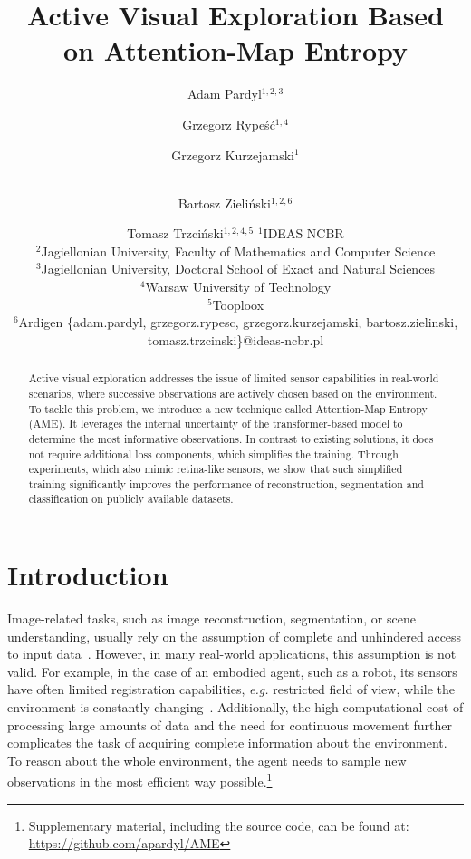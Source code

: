 \documentclass{article}
\title{Active Visual Exploration Based on Attention-Map Entropy}
\author{
Adam Pardyl$^{1,2,3}$\and
Grzegorz Rypeść$^{1,4}$\and
Grzegorz Kurzejamski$^1$\and \\
Bartosz Zieliński$^{1,2,6}$\and
Tomasz Trzciński$^{1,2,4,5}$
\affiliations
$^1$IDEAS NCBR\\
$^2$Jagiellonian University, Faculty of Mathematics and Computer Science\\
$^3$Jagiellonian University, Doctoral School of Exact and Natural Sciences\\
$^4$Warsaw University of Technology\\
$^5$Tooploox\\
$^6$Ardigen
\emails
\{adam.pardyl, grzegorz.rypesc, grzegorz.kurzejamski, bartosz.zielinski, tomasz.trzcinski\}@ideas-ncbr.pl
}
\begin{document}
\maketitle

\begin{abstract}
Active visual exploration addresses the issue of limited sensor capabilities in real-world scenarios, where successive observations are actively chosen based on the environment. To tackle this problem, we introduce a new technique called Attention-Map Entropy (AME). It leverages the internal uncertainty of the transformer-based model to determine the most informative observations. In contrast to existing solutions, it does not require additional loss components, which simplifies the training. Through experiments, which also mimic retina-like sensors, we show that such simplified training significantly improves the performance of reconstruction, segmentation and classification on publicly available datasets.

\end{abstract}

\section{Introduction}
\label{sec:intro}

Image-related tasks, such as image reconstruction, segmentation, or scene understanding, usually rely on the assumption of complete and unhindered access to input data~\cite{girdhar2022omnivore}.
 However, in many real-world applications, this assumption is not valid. For example, in the case of an embodied agent, such as a robot, its sensors have often limited registration capabilities, {\it e.g.} restricted field of view, while the environment is constantly changing~\cite{4seasons}. Additionally, the high computational cost of processing large amounts of data and the need for continuous movement further complicates the task of acquiring complete information about the environment. To reason about the whole environment, the agent needs to sample new observations in the most efficient way possible.\footnote{Supplementary material, including the source code, can be found at: \url{https://github.com/apardyl/AME}}


\end{document}
